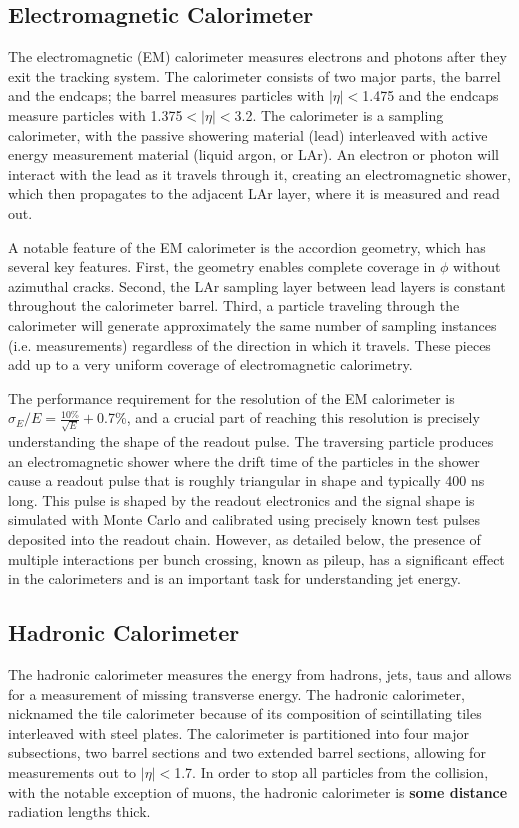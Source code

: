 \documentclass[11pt]{article}
\begin{document}
\subsection{Electromagnetic Calorimeter}
The electromagnetic (EM) calorimeter measures electrons and photons after they exit the tracking system.  The calorimeter consists of two major parts, the barrel and the endcaps; the barrel measures particles with $|\eta|<$1.475 and the endcaps measure particles with 1.375$<|\eta|<$3.2.  The calorimeter is a sampling calorimeter, with the passive showering material (lead) interleaved with active energy measurement material (liquid argon, or LAr).  An electron or photon will interact with the lead as it travels through it, creating an electromagnetic shower, which then propagates to the adjacent LAr layer, where it is measured and read out.

A notable feature of the EM calorimeter is the accordion geometry, which has several key features.  First, the geometry enables complete coverage in $\phi$ without azimuthal cracks.  Second, the LAr sampling layer between lead layers is constant throughout the calorimeter barrel.  Third, a particle traveling through the calorimeter will generate approximately the same number of sampling instances (i.e. measurements) regardless of the direction in which it travels.  These pieces add up to a very uniform coverage of electromagnetic calorimetry.

The performance requirement for the resolution of the EM calorimeter is $\sigma_E/E=\frac{10\%}{\sqrt{E}}+$0.7\%, and a crucial part of reaching this resolution is precisely understanding the shape of the readout pulse.  The traversing particle produces an electromagnetic shower where the drift time of the particles in the shower cause a readout pulse that is roughly triangular in shape and typically 400 ns long.  This pulse is shaped by the readout electronics and the signal shape is simulated with Monte Carlo and calibrated using precisely known test pulses deposited into the readout chain.  However, as detailed below, the presence of multiple interactions per bunch crossing, known as pileup, has a significant effect in the calorimeters and is an important task for understanding jet energy.

\subsection{Hadronic Calorimeter} 
The hadronic calorimeter measures the energy from hadrons, jets, taus and allows for a measurement of missing transverse energy.  The hadronic calorimeter, nicknamed the tile calorimeter because of its composition of scintillating tiles interleaved with steel plates.  The calorimeter is partitioned into four major subsections, two barrel sections and two extended barrel sections, allowing for measurements out to $|\eta|<$1.7.  In order to stop all particles from the collision, with the notable exception of muons, the hadronic calorimeter is \textbf{some distance} radiation lengths thick.
\end{document}
